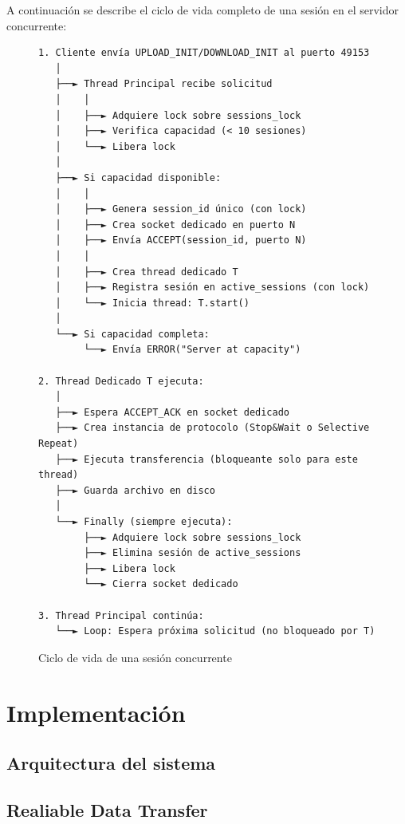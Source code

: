 A continuación se describe el ciclo de vida completo de una sesión en el servidor concurrente:

\begin{figure}[H]
\centering
\begin{verbatim}
1. Cliente envía UPLOAD_INIT/DOWNLOAD_INIT al puerto 49153
   │
   ├──► Thread Principal recibe solicitud
   │    │
   │    ├──► Adquiere lock sobre sessions_lock
   │    ├──► Verifica capacidad (< 10 sesiones)
   │    └──► Libera lock
   │
   ├──► Si capacidad disponible:
   │    │
   │    ├──► Genera session_id único (con lock)
   │    ├──► Crea socket dedicado en puerto N
   │    ├──► Envía ACCEPT(session_id, puerto N)
   │    │
   │    ├──► Crea thread dedicado T
   │    ├──► Registra sesión en active_sessions (con lock)
   │    └──► Inicia thread: T.start()
   │
   └──► Si capacidad completa:
        └──► Envía ERROR("Server at capacity")

2. Thread Dedicado T ejecuta:
   │
   ├──► Espera ACCEPT_ACK en socket dedicado
   ├──► Crea instancia de protocolo (Stop&Wait o Selective Repeat)
   ├──► Ejecuta transferencia (bloqueante solo para este thread)
   ├──► Guarda archivo en disco
   │
   └──► Finally (siempre ejecuta):
        ├──► Adquiere lock sobre sessions_lock
        ├──► Elimina sesión de active_sessions
        ├──► Libera lock
        └──► Cierra socket dedicado

3. Thread Principal continúa:
   └──► Loop: Espera próxima solicitud (no bloqueado por T)
\end{verbatim}
\caption{Ciclo de vida de una sesión concurrente}
\end{figure}

















\section{Implementación}
\subsection{Arquitectura del sistema}
\subsection{Realiable Data Transfer}
